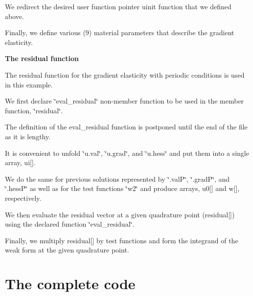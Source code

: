 We redirect the desired user function pointer {\ttfamily uinit} function that we defined above.


\begin{DoxyCodeInclude}

\end{DoxyCodeInclude}


Finally, we define various (9) material parameters that describe the gradient elasticity.


\begin{DoxyCodeInclude}

\end{DoxyCodeInclude}


{\bfseries  The {\ttfamily residual} function }

The residual function for the gradient elasticity with periodic conditions is used in this example.

We first declare {\ttfamily \char`\"{}eval\-\_\-residual\char`\"{}} non-\/member function to be used in the member function, {\ttfamily \char`\"{}residual\char`\"{}}.


\begin{DoxyCodeInclude}

\end{DoxyCodeInclude}


The definition of the {\ttfamily eval\-\_\-residual} function is postponed until the end of the file as it is lengthy.

It is convenient to unfold \char`\"{}u.\-val\char`\"{}, \char`\"{}u.\-grad\char`\"{}, and \char`\"{}u.\-hess\char`\"{} and put them into a single array, ui\mbox{[}\mbox{]}.


\begin{DoxyCodeInclude}

\end{DoxyCodeInclude}


We do the same for previous solutions represented by \char`\"{}.\-val\-P\char`\"{}, \char`\"{}.\-grad\-P\char`\"{}, and \char`\"{}.\-hess\-P\char`\"{} as well as for the test functions \char`\"{}w2\char`\"{} and produce arrays, u0\mbox{[}\mbox{]} and w\mbox{[}\mbox{]}, respectively.

We then evaluate the residual vector at a given quadrature point (residual\mbox{[}\mbox{]}) using the declared function \char`\"{}eval\-\_\-residual\char`\"{}.


\begin{DoxyCodeInclude}

\end{DoxyCodeInclude}


Finally, we multiply residual\mbox{[}\mbox{]} by test functions and form the integrand of the weak form at the given quadrature point.


\begin{DoxyCodeInclude}

\end{DoxyCodeInclude}


\section*{The complete code }

 
\begin{DoxyCodeInclude}

\end{DoxyCodeInclude}
 
